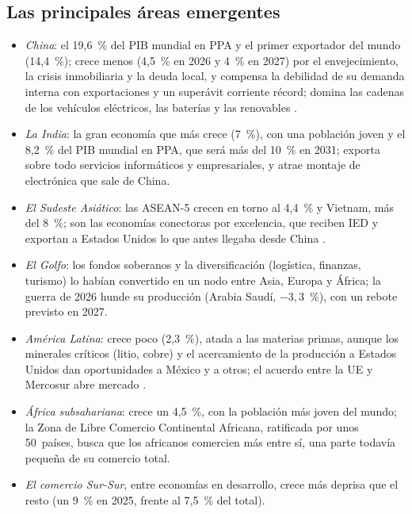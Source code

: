 \documentclass[11pt]{article}
\begin{document}
\subsection{Las principales áreas emergentes}\label{sec:areas}

\begin{itemize}
\item \emph{China}: el 19,6~\% del PIB mundial en PPA y el primer exportador del mundo (14,4~\%); crece menos (4,5~\% en 2026 y 4~\% en 2027) por el envejecimiento, la crisis inmobiliaria y la deuda local, y compensa la debilidad de su demanda interna con exportaciones y un superávit corriente récord; domina las cadenas de los vehículos eléctricos, las baterías y las renovables\nocite{FMI2026DataMapper,FMI2026ESR} .
\item \emph{La India}: la gran economía que más crece (7~\%), con una población joven y el 8,2~\% del PIB mundial en PPA, que será más del 10~\% en 2031; exporta sobre todo servicios informáticos y empresariales, y atrae montaje de electrónica que sale de China.
\item \emph{El Sudeste Asiático}: las ASEAN-5 crecen en torno al 4,4~\% y Vietnam, más del 8~\%; son las economías conectoras por excelencia, que reciben IED y exportan a Estados Unidos lo que antes llegaba desde China\nocite{Gopinath2025Linkages} .
\item \emph{El Golfo}: los fondos soberanos y la diversificación (logística, finanzas, turismo) lo habían convertido en un nodo entre Asia, Europa y África; la guerra de 2026 hunde su producción (Arabia Saudí, $-3{,}3$~\%), con un rebote previsto en 2027\nocite{FMI2026WEO}.
\item \emph{América Latina}: crece poco (2,3~\%), atada a las materias primas, aunque los minerales críticos (litio, cobre) y el acercamiento de la producción a Estados Unidos dan oportunidades a México y a otros; el acuerdo entre la UE y Mercosur abre mercado .
\item \emph{África subsahariana}: crece un 4,5~\%, con la población más joven del mundo; la Zona de Libre Comercio Continental Africana, ratificada por unos 50~países, busca que los africanos comercien más entre sí, una parte todavía pequeña de su comercio total\nocite{AfCFTA2026}.
\item \emph{El comercio Sur-Sur}, entre economías en desarrollo, crece más deprisa que el resto (un 9~\% en 2025, frente al 7,5~\% del total)\nocite{UNCTAD2026GTU}.
\end{itemize}
\end{document}
